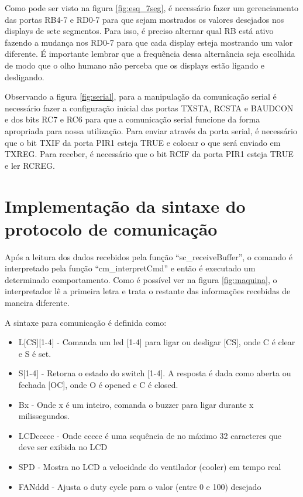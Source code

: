 \documentclass{article}
\begin{document}
Como pode ser visto na figura \ref{fig:esq_7seg}, é necessário fazer um gerenciamento das portas RB4-7 e RD0-7 para que sejam mostrados os valores desejados nos displays de sete segmentos. Para isso, é preciso alternar qual RB está ativo fazendo a mudança nos RD0-7 para que cada display esteja mostrando um valor diferente. É importante lembrar que a frequência dessa alternância seja escolhida de modo que o olho humano não perceba que os displays estão ligando e desligando.

Observando a figura \ref{fig:serial}, para a manipulação da comunicação serial é necessário fazer a configuração inicial das portas TXSTA, RCSTA e BAUDCON e dos bits RC7 e RC6 para que a comunicação serial funcione da forma apropriada para nossa utilização.  Para enviar através da porta serial, é necessário que o bit TXIF da porta PIR1 esteja TRUE e colocar o que será enviado em TXREG. Para receber, é necessário que o bit RCIF da porta PIR1 esteja TRUE e ler RCREG.

\section{Implementação da sintaxe do protocolo de comunicação}

Após a leitura dos dados recebidos pela função ``sc\_receiveBuffer'', o comando é interpretado pela função ``cm\_interpretCmd'' e então é executado um determinado comportamento. Como é possível ver na figura \ref{fig:maquina}, o interpretador lê a primeira letra e trata o restante das informações recebidas de maneira diferente.

A sintaxe para comunicação é definida como:
\begin{itemize}
\item L[CS][1-4] - Comanda um led [1-4] para ligar ou desligar [CS], onde C é clear e S é set.
\item S[1-4] - Retorna o estado do switch [1-4]. A resposta é dada como aberta ou fechada [OC], onde O é opened e C é closed.
\item Bx - Onde x é um inteiro, comanda o buzzer para ligar durante x milissegundos.
\item LCDccccc - Onde ccccc é uma sequência de no máximo 32 caracteres que deve ser exibida no LCD
\item SPD - Mostra no LCD a velocidade do ventilador (cooler) em tempo real
\item FANddd - Ajusta o duty cycle para o valor (entre 0 e 100) desejado
\end{itemize}
\end{document}
